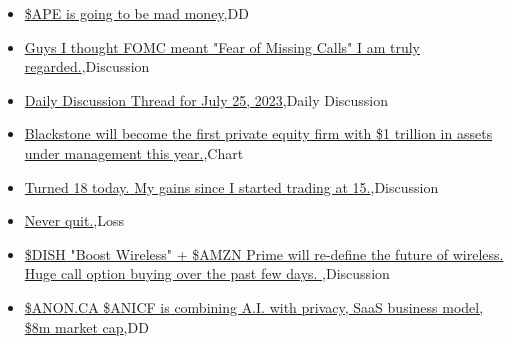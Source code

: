 \documentclass{article}%
\begin{document}
%
\begin{itemize}%
\item%
\href{https://reddit.com/r/wallstreetbets/comments/159756c/ape\_is\_going\_to\_be\_mad\_money/}{\$APE is going to be mad money},DD%
\item%
\href{https://reddit.com/r/wallstreetbets/comments/1594m7k/guys\_i\_thought\_fomc\_meant\_fear\_of\_missing\_calls\_i/}{Guys I thought FOMC meant "Fear of Missing Calls" I am truly regarded.},Discussion%
\item%
\href{https://reddit.com/r/wallstreetbets/comments/1594007/daily\_discussion\_thread\_for\_july\_25\_2023/}{Daily Discussion Thread for July 25, 2023},Daily Discussion%
\item%
\href{https://reddit.com/r/wallstreetbets/comments/15923z8/blackstone\_will\_become\_the\_first\_private\_equity/}{Blackstone will become the first private equity firm with \$1 trillion in assets under management this year.},Chart%
\item%
\href{https://reddit.com/r/wallstreetbets/comments/158ztys/turned\_18\_today\_my\_gains\_since\_i\_started\_trading/}{Turned 18 today. My gains since I started trading at 15.},Discussion%
\item%
\href{https://reddit.com/r/wallstreetbets/comments/158xodx/never\_quit/}{Never quit.},Loss%
\item%
\href{https://reddit.com/r/wallstreetbets/comments/158vexz/dish\_boost\_wireless\_amzn\_prime\_will\_redefine\_the/}{\$DISH "Boost Wireless" + \$AMZN Prime will re-define the future of wireless. Huge call option buying over the past few days. },Discussion%
\item%
\href{https://reddit.com/r/Baystreetbets/comments/1595865/anonca\_anicf\_is\_combining\_ai\_with\_privacy\_saas/}{\$ANON.CA \$ANICF is combining A.I. with privacy, SaaS business model, \$8m market cap},DD%
\end{itemize}%
\end{document}
